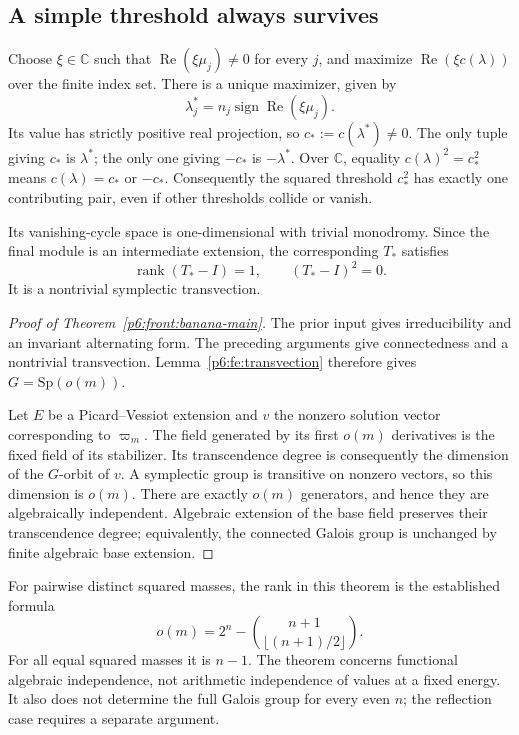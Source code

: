 \documentclass[11pt,a4paper]{article}
\theoremstyle{definition}
\theoremstyle{remark}
\numberwithin{equation}{section}
\begin{document}
\subsection{A simple threshold always survives}

Choose $\xi\in\mathbb C$ such that
$\operatorname{Re}(\xi\mu_j)\ne0$ for every $j$, and maximize
$\operatorname{Re}(\xi c(\lambda))$ over the finite index set.
There is a unique maximizer, given by
\[
 \lambda_j^*=n_j\operatorname{sign}\operatorname{Re}(\xi\mu_j).
\]
Its value has strictly positive real projection, so
$c_*:=c(\lambda^*)\ne0$. The only tuple giving $c_*$ is
$\lambda^*$; the only one giving $-c_*$ is $-\lambda^*$.
Over $\mathbb C$, equality $c(\lambda)^2=c_*^2$ means
$c(\lambda)=c_*$ or $-c_*$. Consequently the squared threshold
$c_*^2$ has exactly one contributing pair, even if other
thresholds collide or vanish.

Its vanishing-cycle space is one-dimensional with trivial
monodromy. Since the final module is an intermediate extension,
the corresponding $T_*$ satisfies
\[
                 \operatorname{rank}(T_*-I)=1,
                 \qquad (T_*-I)^2=0.
\]
It is a nontrivial symplectic transvection.

\begin{proof}[Proof of Theorem~\ref{p6:front:banana-main}]
The prior input gives irreducibility and an invariant alternating
form. The preceding arguments give connectedness and a nontrivial
transvection. Lemma~\ref{p6:fe:transvection} therefore gives
$G=\mathrm{Sp}(o(m))$.

Let $E$ be a Picard--Vessiot extension and $v$ the nonzero solution
vector corresponding to $\varpi_m$. The field generated by its
first $o(m)$ derivatives is the fixed field of its stabilizer.
Its transcendence degree is consequently the dimension of the
$G$-orbit of $v$. A symplectic group is transitive on nonzero
vectors, so this dimension is $o(m)$. There are exactly $o(m)$
generators, and hence they are algebraically independent.
Algebraic extension of the base field preserves their transcendence
degree; equivalently, the connected Galois group is unchanged by
finite algebraic base extension.
\end{proof}

For pairwise distinct squared masses, the rank in this theorem is
the established formula
\[
 o(m)=2^n-\binom{n+1}{\lfloor(n+1)/2\rfloor}.
\]
For all equal squared masses it is $n-1$.
The theorem concerns functional algebraic independence, not
arithmetic independence of values at a fixed energy. It also
does not determine the full Galois group for every even $n$;
the reflection case requires a separate argument.
\end{document}
